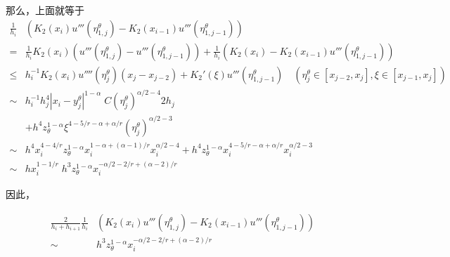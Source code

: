 \documentclass{ctexart}
\begin{document}
那么，上面就等于
\begin{equation}
    \begin{aligned}
        \frac{1}{h_i} & (K_2(x_{i}) u'''(\eta_{1,j}^\theta) - K_2(x_{i-1}) u'''(\eta_{1,j-1}^\theta))                                                                                      \\
        =             & \frac{1}{h_i} K_2(x_{i}) ( u'''(\eta_{1,j}^\theta) - u'''(\eta_{1,j-1}^\theta) ) + \frac{1}{h_i} (K_2(x_{i}) - K_2(x_{i-1}) u'''(\eta_{1,j-1}^\theta))             \\
        \le           & h_i^{-1}K_2(x_i) u''''(\eta_{j}^\theta) (x_j-x_{j-2}) + K_2'(\xi)u'''(\eta_{1,j-1}^\theta)    \quad (\eta_j^\theta \in [x_{j-2}, x_{j}], \xi \in [x_{j-1}, x_{j}]) \\
        \sim          & h_i^{-1} h_j^4 |x_i-y_{j}^\theta|^{1-\alpha}\; C (\eta_{j}^\theta)^{\alpha/2-4} 2h_j                                                                               \\
                      & + h^4 z_\theta^{1-\alpha} \xi^{4-5/r-\alpha+\alpha/r} (\eta_{j}^\theta)^{\alpha/2-3}                                                                               \\
        \sim          & h^4 x_i^{4-4/r}z_\theta^{1-\alpha} x_i^{1-\alpha+(\alpha-1)/r} x_i^{\alpha/2-4}
        + h^4 z_\theta^{1-\alpha} x_i^{4-5/r-\alpha+\alpha/r} x_i^{\alpha/2-3}                                                                                                             \\
        \sim          & hx_i^{1-1/r} \; h^3 z_\theta^{1-\alpha} x_i^{-\alpha/2-2/r+(\alpha-2)/r}
    \end{aligned}
\end{equation}


因此，

\begin{equation}
    \begin{aligned}
        \frac{2}{h_{i}+h_{i+1}} \frac{1}{h_i} & (K_2(x_{i}) u'''(\eta_{1,j}^\theta) - K_2(x_{i-1}) u'''(\eta_{1,j-1}^\theta)) \\
        \sim                                  & h^3 z_\theta^{1-\alpha} x_i^{-\alpha/2-2/r+(\alpha-2)/r}
    \end{aligned}
\end{equation}
\end{document}
